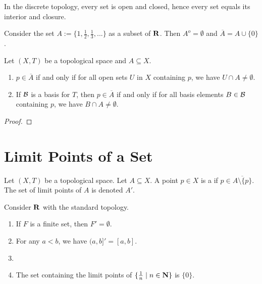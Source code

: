 \begin{example}
    In the discrete topology, every set is open and closed, hence every set equals its interior and closure.
\end{example}

\begin{example}
    Consider the set $A:= \{1,\frac{1}{2}, \frac{1}{3},...\}$ as a subset of $\mathbf{R}$. Then $A^o = \emptyset$ and $\overline{A} = A \cup \{0\}$.
\end{example}

\begin{proposition}
    Let $(X,T)$ be a topological space and $A \subseteq X$.
    \phantom{a}
    \begin{enumerate}[label = (\arabic*),itemsep=1pt,topsep=3pt]
        \item $p \in \overline{A}$ if and only if for all open sets $U$ in $X$ containing $p$, we have $U \cap A \neq \emptyset$.
        \item If $\mathcal{B}$ is a basis for $T$, then $p \in \overline{A}$ if and only if for all basis elements $B \in \mathcal{B}$ containing $p$, we have $B \cap A \neq \emptyset$.
    \end{enumerate}
\end{proposition}
    {\color{red} \begin{proof}
        
    \end{proof}}

\section{Limit Points of a Set}

\begin{definition}
    Let $(X,T)$ be a topological space. Let $A \subseteq X$. A point $p \in X$ is a  if $p \in \overline{A \setminus \{p\}}$. The set of limit points of $A$ is denoted $A'$.
\end{definition}

\begin{example}
    Consider $\mathbf{R}$ with the standard topology.
    \begin{enumerate}[label = (\arabic*),itemsep=1pt,topsep=3pt]
        \item If $F$ is a finite set, then $F' = \emptyset$.
        \item For any $a<b$, we have $(a,b]' = [a,b]$.
        \item 
        \item The set containing the limit points of $\{\frac{1}{n} \mid n \in \mathbf{N}\}$ is $\{0\}$.
    \end{enumerate}
\end{example}

